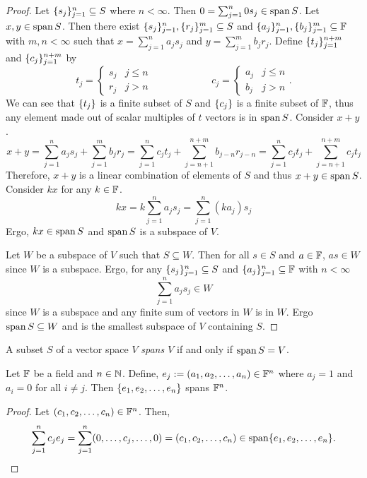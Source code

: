 \begin{proof}
	Let $\lbrace s_j \rbrace_{j=1}^n\subseteq S$ where $n < \infty$.
	Then $0=\sum_{j=1}^n 0 s_j\in\operatorname{span} S$.
	Let $x,y\in\operatorname{span} S$.
	Then there exist $\lbrace s_j \rbrace_{j=1}^n,\lbrace r_j \rbrace_{j=1}^m\subseteq S$ and $\lbrace a_j \rbrace_{j=1}^n,\lbrace b_j \rbrace_{j=1}^m\subseteq\mathbb{F}$ with $m,n <\infty$ such that $x=\sum_{j=1}^n a_js_j$ and $y=\sum_{j=1}^mb_jr_j$.
	Define $\lbrace t_j \rbrace_{j=1}^{n+m}$ and $\lbrace c_j \rbrace_{j=1}^{n+m}$ by
	\[
		t_j =
		\begin{cases}
			s_j & j\leq n\\
			r_j & j > n
		\end{cases}
		\hspace{1in}
		c_j =
		\begin{cases}
			a_j & j \leq n\\
			b_j & j > n
		\end{cases}.
	\]
	We can see that $\lbrace t_j \rbrace$ is a finite subset of $S$ and $\lbrace c_j \rbrace$ is a finite subset of $\mathbb{F}$, thus any element made out of scalar multiples of $t$ vectors is in $\operatorname{span} S$.
	Consider $x+y$.
	\[
		x+y = \sum_{j=1}^n a_js_j + \sum_{j=1}^mb_jr_j
		= \sum_{j=1}^n c_jt_j + \sum_{j=n+1}^{n+m}b_{j-n}r_{j-n}
		= \sum_{j=1}^n c_jt_j + \sum_{j=n+1}^{n+m} c_jt_j
	\]
	Therefore, $x+y$ is a linear combination of elements of $S$ and thus $x+y\in\operatorname{span} S$.
	Consider $kx$ for any $k\in\mathbb{F}$.
	\[
		kx=k\sum_{j=1}^n a_js_j=\sum_{j=1}^n (ka_j)s_j
	\]
	Ergo, $kx\in\operatorname{span} S$ and $\operatorname{span} S$ is a subspace of $V$.

	Let $W$ be a subspace of $V$ such that $S\subseteq W$.
	Then for all $s\in S$ and $a\in\mathbb{F}$, $as\in W$ since $W$ is a subspace.
	Ergo, for any $\lbrace s_j \rbrace_{j=1}^n\subseteq S$ and $\lbrace a_j \rbrace_{j=1}^n\subseteq\mathbb{F}$ with $n < \infty$
	\[
		\sum_{j=1}^n a_js_j\in W
	\]
	since $W$ is a subspace and any finite sum of vectors in $W$ is in $W$.
	Ergo $\operatorname{span} S\subseteq W$ and is the smallest subspace of $V$ containing $S$.
\end{proof}

\begin{definition}[Span]
A subset $S$ of a vector space $V$ \textit{spans $V$} if and only if $\operatorname{span} S=V$.
\end{definition}

\begin{example}
	Let $\mathbb{F}$ be a field and $n\in\mathbb{N}$.
	Define, $e_j:=(a_1,a_2,\ldots,a_n)\in\mathbb{F}^n$ where $a_j=1$ and $a_i=0$ for all $i\neq j$.
	Then $\lbrace e_1,e_2,\ldots,e_n \rbrace$ spans $\mathbb{F}^n$.
\end{example}
\begin{proof}
	Let $(c_1,c_2,\ldots,c_n)\in\mathbb{F}^n$.
	Then,
	\[
		\sum_{j=1}^n c_je_j = \sum_{j=1}^n (0,\ldots,c_j,\ldots,0) = (c_1,c_2,\ldots,c_n)\in\operatorname{span}\lbrace e_1,e_2,\ldots,e_n \rbrace.
	\]
\end{proof}

